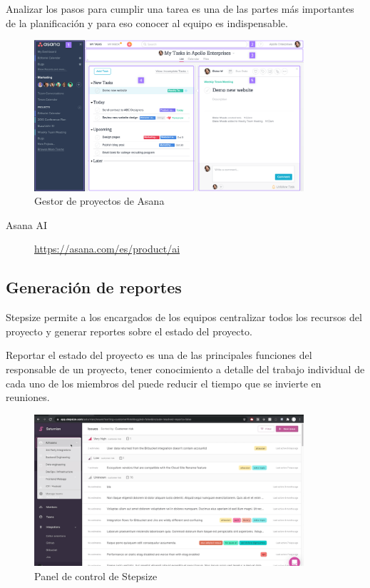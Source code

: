 \documentclass[11pt]{article}
\begin{document}
Analizar los pasos para cumplir una tarea es una de las partes más
importantes de la planificación y para eso conocer al equipo es
indispensable. 

\begin{figure}[htbp]
\centering
\includegraphics[width=10cm]{img/asana.png}
\caption{Gestor de proyectos de Asana}
\end{figure}

\begin{description}
\item[{Asana AI}] \url{https://asana.com/es/product/ai}
\end{description}

\subsection{Generación de reportes}
\label{sec:org133b763}
Stepsize permite a los encargados de los equipos centralizar todos los
recursos del proyecto y generar reportes sobre el estado del
proyecto.

Reportar el estado del proyecto es una de las principales funciones
del responsable de un proyecto, tener conocimiento a detalle del
trabajo individual de cada uno de los miembros del puede reducir el
tiempo que se invierte en reuniones.

\begin{figure}[htbp]
\centering
\includegraphics[width=10cm]{img/step-0.png}
\caption{Panel de control de Stepsize}
\end{figure}
\end{document}
